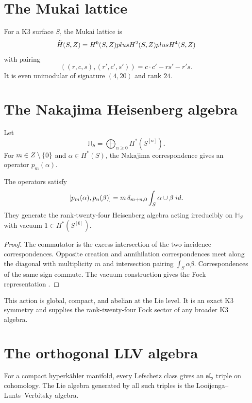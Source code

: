 \chapter{The Mukai lattice}
For a K3 surface $S$, the Mukai lattice is
\[
 \widetilde H(S,Z)=H^0(S,Z)plus H^2(S,Z)plus H^4(S,Z)
\]
with pairing
\[
 ((r,c,s),(r',c',s'))=c\cdot c'-rs'-r's.
\]
It is even unimodular of signature $(4,20)$ and rank $24$.

\chapter{The Nakajima Heisenberg algebra}
Let
\[
 \mathbb H_S=\bigoplus_{n\ge0}H^*(S^{[n]}).
\]
For $m\in Z\setminus\{0\}$ and $\alpha\in H^*(S)$, the Nakajima correspondence gives an operator $p_m(\alpha)$.

\begin{theorem}
The operators satisfy
\[
 [p_m(\alpha),p_n(\beta)]
 =m\,\delta_{m+n,0}\int_S\alpha\cup\beta\;id.
\]
They generate the rank-twenty-four Heisenberg algebra acting irreducibly on $\mathbb H_S$ with vacuum $1\in H^*(S^{[0]})$.
\end{theorem}
\begin{proof}
The commutator is the excess intersection of the two incidence correspondences. Opposite creation and annihilation correspondences meet along the diagonal with multiplicity $m$ and intersection pairing $\int_S\alpha\beta$. Correspondences of the same sign commute. The vacuum construction gives the Fock representation \cite{Nakajima97}.
\end{proof}

This action is global, compact, and abelian at the Lie level. It is an exact K3 symmetry and supplies the rank-twenty-four Fock sector of any broader K3 algebra.

\chapter{The orthogonal LLV algebra}
For a compact hyperkähler manifold, every Lefschetz class gives an $\mathfrak{sl}_2$ triple on cohomology. The Lie algebra generated by all such triples is the Looijenga--Lunts--Verbitsky algebra.

